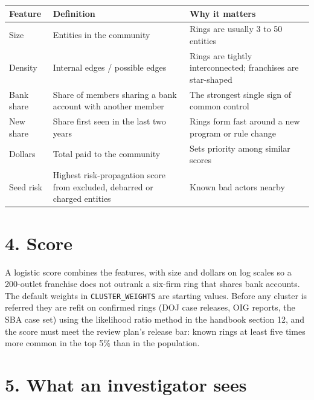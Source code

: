 \documentclass[letterpaper,11pt]{article}
\begin{document}
\begingroup\small\setlength{\tabcolsep}{4pt}\renewcommand{\arraystretch}{1.25}
\begin{longtable}[l]{@{}l>{\raggedright\arraybackslash}p{}>{\raggedright\arraybackslash}p{}@{}}
\rowcolor{coolblack}\leavevmode\color{white}\bfseries Feature & \leavevmode\color{white}\bfseries Definition & \leavevmode\color{white}\bfseries Why it matters \\
\endhead
Size & Entities in the community & Rings are usually 3 to 50 entities \\
Density & Internal edges / possible edges & Rings are tightly interconnected; franchises are star-shaped \\
Bank share & Share of members sharing a bank account with another member & The strongest single sign of common control \\
New share & Share first seen in the last two years & Rings form fast around a new program or rule change \\
Dollars & Total paid to the community & Sets priority among similar scores \\
Seed risk & Highest risk-propagation score from excluded, debarred or charged entities & Known bad actors nearby \\
\end{longtable}\endgroup

\hypertarget{score}{%
\section*{4. Score}\label{score}}

A logistic score combines the features, with size and dollars on log
scales so a 200-outlet franchise does not outrank a six-firm ring that
shares bank accounts. The default weights in \texttt{CLUSTER\_WEIGHTS}
are starting values. Before any cluster is referred they are refit on
confirmed rings (DOJ case releases, OIG reports, the SBA case set) using
the likelihood ratio method in the handbook section 12, and the score
must meet the review plan's release bar: known rings at least five times
more common in the top 5\% than in the population.

\hypertarget{what-an-investigator-sees}{%
\section*{5. What an investigator
sees}\label{what-an-investigator-sees}}
\end{document}
